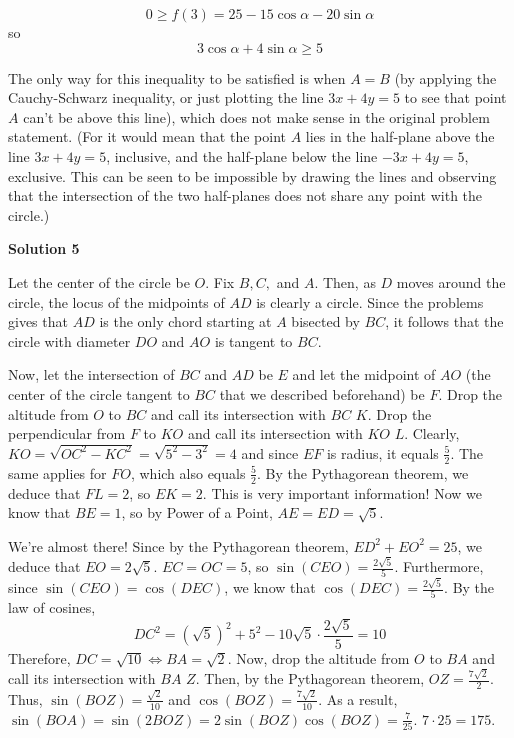 \begin{enumerate}
 
 \[0 \geq  f(3) =  25  - 15\cos \alpha - 20 \sin \alpha\]so
 \[3\cos \alpha + 4 \sin \alpha  \geq 5\]

 The only way for this inequality to be satisfied is when $A=B$ (by applying the Cauchy-Schwarz inequality, or just plotting the line $3x+4y=5$ to see that point $A$ can't be above this line), which does not make sense in the original problem statement. (For it would mean that the point $A$ lies in the half-plane above the line $3x+4y=5$, inclusive, and the half-plane below the line $-3x+4y=5$, exclusive. This can be seen to be impossible by drawing the lines and observing that the intersection of the two half-planes does not share any point with the circle.)

 



\textbf{Solution 5}

Let the center of the circle be $O$. Fix $B,C,$ and $A$. Then, as $D$ moves around the circle, the locus of the midpoints of $AD$ is clearly a circle. Since the problems gives that $AD$ is the only chord starting at $A$ bisected by $BC$, it follows that the circle with diameter $DO$ and $AO$ is tangent to $BC$.

 Now, let the intersection of $BC$ and $AD$ be $E$ and let the midpoint of $AO$ (the center of the circle tangent to $BC$ that we described beforehand) be $F$. Drop the altitude from $O$ to $BC$ and call its intersection with $BC$ $K$. Drop the perpendicular from $F$ to $KO$ and call its intersection with $KO$ $L$. Clearly, $KO = \sqrt{OC^2-KC^2} = \sqrt{5^2-3^2} = 4$ and since $EF$ is radius, it equals $\frac{5}{2}$. The same applies for $FO$, which also equals $\frac{5}{2}$. By the Pythagorean theorem, we deduce that $FL = 2$, so $EK = 2$. This is very important information! Now we know that $BE = 1$, so by Power of a Point, $AE = ED = \sqrt{5}$.

 We’re almost there! Since by the Pythagorean theorem, $ED^2 + EO^2 = 25$, we deduce that $EO = 2\sqrt{5}$. $EC=OC=5$, so $\sin (CEO) = \frac{2\sqrt{5}}{5}$. Furthermore, since $\sin (CEO) = \cos(DEC)$, we know that $\cos (DEC) = \frac{2\sqrt{5}}{5}$. By the law of cosines,
 \[DC^2 = (\sqrt{5})^2 + 5^2 -10\sqrt{5} \cdot \frac{2\sqrt{5}}{5} = 10\]Therefore, $DC = \sqrt{10} \Longleftrightarrow BA = \sqrt{2}$. Now, drop the altitude from $O$ to $BA$ and call its intersection with $BA$ $Z$. Then, by the Pythagorean theorem, $OZ = \frac{7\sqrt{2}}{2}$. Thus, $\sin (BOZ) = \frac{\sqrt{2}}{10}$ and $\cos (BOZ) = \frac{7\sqrt{2}}{10}$. As a result, $\sin (BOA) = \sin (2 BOZ) = 2\sin(BOZ)\cos(BOZ) = \frac{7}{25}$. $7 \cdot 25 = \boxed{175}$.


\end{enumerate}
